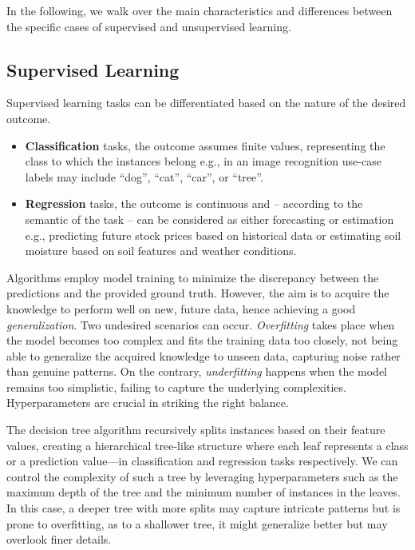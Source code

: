 In the following, we walk over the main characteristics and differences between the specific cases of supervised and unsupervised learning.

\subsection{Supervised Learning}

Supervised learning tasks can be differentiated based on the nature of the desired outcome.
\begin{itemize}
    \item \textbf{Classification} tasks, the outcome assumes finite values, representing the class to which the instances belong e.g., in an image recognition use-case labels may include ``dog'', ``cat'', ``car'', or ``tree''.
    \item \textbf{Regression} tasks, the outcome is continuous and -- according to the semantic of the task -- can be considered as either forecasting or estimation e.g., predicting future stock prices based on historical data or estimating soil moisture based on soil features and weather conditions.
\end{itemize}
Algorithms employ model training to minimize the discrepancy between the predictions and the provided ground truth.
However, the aim is to acquire the knowledge to perform well on new, future data, hence achieving a good \textit{generalization}.
Two undesired scenarios can occur.
\textit{Overfitting} takes place when the model becomes too complex and fits the training data too closely, not being able to generalize the acquired knowledge to unseen data, capturing noise rather than genuine patterns.
On the contrary, \textit{underfitting} happens when the model remains too simplistic, failing to capture the underlying complexities.
Hyperparameters are crucial in striking the right balance.

\begin{example}
    \label{ex:decision_tree}
    The decision tree algorithm recursively splits instances based on their feature values, creating a hierarchical tree-like structure where each leaf represents a class or a prediction value---in classification and regression tasks respectively.
    We can control the complexity of such a tree by leveraging hyperparameters such as the maximum depth of the tree and the minimum number of instances in the leaves.
    In this case, a deeper tree with more splits may capture intricate patterns but is prone to overfitting, as to a shallower tree, it might generalize better but may overlook finer details.
\end{example}

